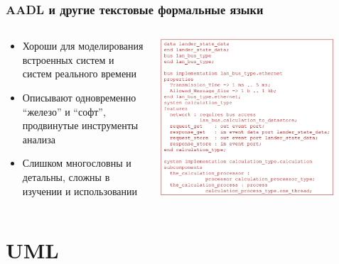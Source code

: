 \documentclass{../../slides-style}
\begin{document}
    \begin{frame}
        \frametitle{AADL и другие текстовые формальные языки}
        \begin{columns}
            \begin{column}{0.4\textwidth}
                \begin{small}
                    \begin{itemize}
                        \item Хороши для моделирования встроенных систем и систем реального времени
                        \item Описывают одновременно ``железо'' и ``софт'', продвинутые инструменты анализа
                        \item Слишком многословны и детальны, сложны в изучении и использовании
                    \end{itemize}
                \end{small}
            \end{column}
            \begin{column}{0.6\textwidth}
                \begin{center}
                    \includegraphics[width=0.85\textwidth]{aadl.png}
                \end{center}
            \end{column}
        \end{columns}
    \end{frame}

    \section{UML}
\end{document}
